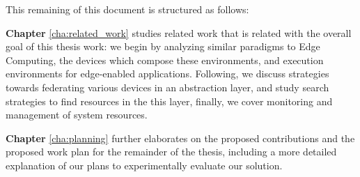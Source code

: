 This remaining of this document is structured as follows:

\textbf{Chapter} \ref{cha:related_work} studies related work that is related with the overall goal of this thesis work: we begin by analyzing similar paradigms to Edge Computing, the devices which compose these environments, and execution environments for edge-enabled applications. Following, we discuss strategies towards federating various devices in an abstraction layer, and study search strategies to find resources in the this layer, finally, we cover monitoring and management of system resources.

\textbf{Chapter} \ref{cha:planning} further elaborates on the proposed contributions and the proposed work plan for the remainder of the thesis, including a more detailed explanation of our plans to experimentally evaluate our solution.
